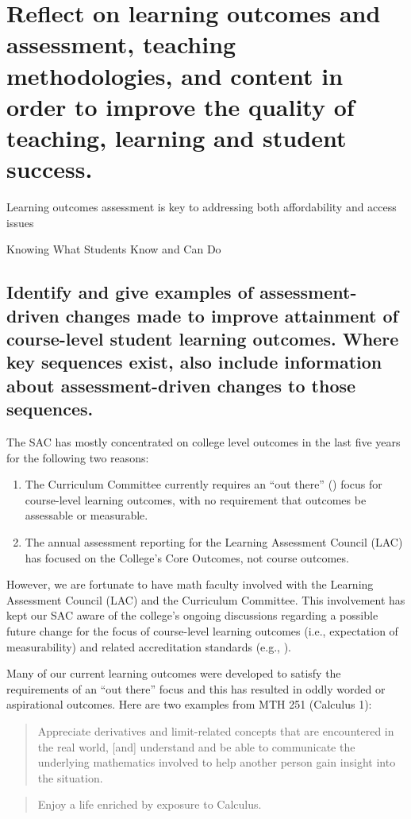 \chapter[Outcomes and Assessment]{Reflect on learning outcomes and assessment,
  teaching methodologies, and content in order to improve the quality of teaching,
  learning and student success.}\label{chap:outcomes}
\epigraph{Learning outcomes assessment is key to addressing both affordability and access issues}
{Knowing What Students Know and Can Do \cite{outcomesquote}}

\section[Course-level outcomes]{Identify and give examples of assessment-driven
  changes made to improve attainment of course-level student learning outcomes.
  Where key sequences exist, also include information about assessment-driven changes to those sequences.}

The SAC has mostly concentrated on college level outcomes in the last five years for the following two reasons:
\begin{enumerate}
	\item The Curriculum Committee currently requires an ``out there'' (\cite{courseoutcomes}) focus for course-level learning outcomes, with no requirement that outcomes be assessable or measurable.
	\item The annual assessment reporting for the Learning Assessment Council (LAC) has focused on the College's Core Outcomes, not course outcomes.
\end{enumerate}

However, we are fortunate to have math faculty involved with the Learning Assessment Council (LAC) and the Curriculum Committee.
This involvement has kept our SAC aware of the college's ongoing discussions regarding a possible future change for the focus of course-level learning outcomes  (i.e., expectation of measurability) and related accreditation standards (e.g., \cite[Standard 4.A.3]{NWCCU}).

Many of our current learning outcomes were developed to satisfy the requirements of an ``out there'' focus and this has resulted in oddly worded or aspirational outcomes.
Here are two examples from MTH 251 (Calculus 1):

\begin{quote}
	Appreciate derivatives and limit-related concepts that are encountered in the real world, [and] understand and be able to communicate the underlying mathematics involved to help another person gain insight into the situation.
\end{quote}
\begin{quote}
	Enjoy a life enriched by exposure to Calculus.
\end{quote}

